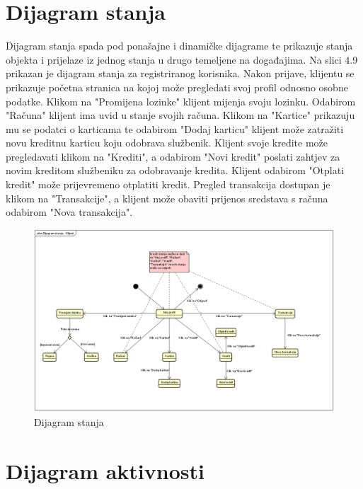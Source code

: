 		\section{Dijagram stanja}
			
			
			
			
			Dijagram stanja spada pod ponašajne i dinamičke dijagrame te prikazuje stanja objekta i prijelaze iz jednog stanja u drugo temeljene na događajima. Na slici 4.9 prikazan je dijagram stanja za registriranog korisnika. Nakon prijave, klijentu se prikazuje početna stranica na kojoj može pregledati svoj profil odnosno osobne podatke. Klikom na "Promijena lozinke" klijent mijenja svoju lozinku. Odabirom "Računa" klijent ima uvid u stanje svojih računa. Klikom na "Kartice" prikazuju mu se podatci o karticama te odabirom "Dodaj karticu" klijent može zatražiti novu kreditnu karticu koju odobrava službenik. Klijent svoje kredite može pregledavati klikom na "Krediti", a odabirom "Novi kredit" poslati zahtjev za novim kreditom službeniku za odobravanje kredita. Klijent odabirom "Otplati kredit" može prijevremeno otplatiti kredit. Pregled transakcija dostupan je klikom na "Transakcije", a klijent može obaviti prijenos sredstava s računa odabirom "Nova transakcija".  
			
			\begin{figure}[H]
				\includegraphics[scale=0.65]{Slike/dijagramStanja.PNG}
				\centering
				\caption{Dijagram stanja}
				\label{fig:dijagram}
			\end{figure}
			
			
			
			
			
		
		\section{Dijagram aktivnosti}
			
